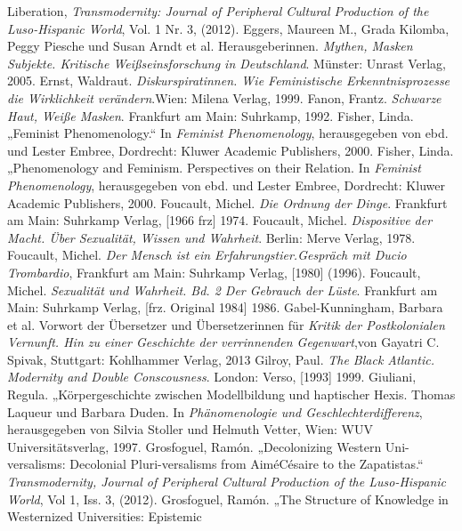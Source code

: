 \begin{thebibliography}{100}
Liberation, \emph{Transmodernity: Journal of Peripheral Cultural Production
of the Luso-Hispanic World}, Vol. 1 Nr. 3, (2012).
 Eggers, Maureen M., Grada Kilomba, Peggy Piesche und Susan
Arndt  et al. Herausgeberinnen. \emph{Mythen, Masken Subjekte. Kritische
Weißseinsforschung in Deutschland}. Münster: Unrast Verlag, 2005.
 Ernst, Waldraut. \emph{Diskurspiratinnen. Wie Feministische
  Erkenntnisprozesse die Wirklichkeit verändern}.Wien: Milena Verlag, 1999.
   Fanon, Frantz. \emph{Schwarze Haut, Weiße Masken}. Frankfurt am Main: Suhrkamp, 1992. 
   Fisher, Linda. „Feminist Phenomenology.“ In \emph{Feminist   Phenomenology}, herausgegeben von ebd. und Lester Embree, Dordrecht: Kluwer Academic Publishers, 2000.
   Fisher, Linda. „Phenomenology and Feminism. Perspectives
  on their Relation. In \emph{Feminist Phenomenology}, herausgegeben von ebd. und Lester Embree,  Dordrecht: Kluwer Academic Publishers, 2000. 
   Foucault, Michel. \emph{Die Ordnung der Dinge}. Frankfurt am Main: Suhrkamp Verlag, [1966 frz] 1974.
   Foucault, Michel. \emph{Dispositive der Macht. Über
  Sexualität, Wissen und Wahrheit}. Berlin: Merve Verlag, 1978.
   Foucault, Michel. \emph{Der Mensch ist ein
  Erfahrungstier.Gespräch mit Ducio Trombardio}, Frankfurt am Main: Suhrkamp Verlag, [1980] (1996).
   Foucault, Michel. \emph{Sexualität und Wahrheit. Bd. 2
  Der Gebrauch der Lüste}.  Frankfurt am Main: Suhrkamp Verlag, [frz. Original 1984] 1986.
   Gabel-Kunningham, Barbara et al. Vorwort der Übersetzer
  und Übersetzerinnen für \emph{Kritik der Postkolonialen Vernunft. Hin zu
  einer Geschichte der verrinnenden Gegenwart},von Gayatri C. Spivak, Stuttgart: Kohlhammer Verlag, 2013
   Gilroy, Paul. \emph{The Black Atlantic. Modernity and Double Conscousness}. London: Verso, [1993] 1999.
   Giuliani, Regula. „Körpergeschichte zwischen Modellbildung und haptischer Hexis. Thomas
  Laqueur und Barbara Duden. In \emph{Phänomenologie und Geschlechterdifferenz}, herausgegeben von Silvia Stoller und Helmuth Vetter, Wien: WUV Universitätsverlag, 1997.
   Grosfoguel, Ramón. „Decolonizing Western Uni-versalisms:
  Decolonial Pluri-versalisms from AiméCésaire to the Zapatistas.“ \emph{Transmodernity, Journal of Peripheral Cultural Production of the Luso-Hispanic World}, Vol 1, Iss. 3, (2012). 
   Grosfoguel, Ramón. „The Structure of Knowledge in Westernized Universities: Epistemic

\end{thebibliography}
